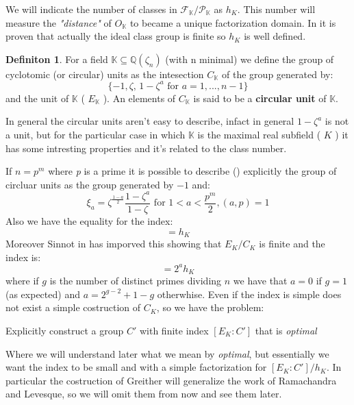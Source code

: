 \documentclass[]{article}
\theoremstyle{plain}
\theoremstyle{remark}
\theoremstyle{definition}
\newtheorem{deff}[teo]{Definiton}
\newcommand{\K}{\mathbb{K}}
\newcommand{\Q}{\mathbb{Q}}
\begin{document}
	We will indicate the number of classes in $ \mathcal{F}_\K / \mathcal{P}_\K $ as $ h_K $. This number will measure the \textit{"distance"} of $ O_\K $ to became a unique factorization domain. In \cite[Page~141]{RIN} it is proven that actually the ideal class group is finite so $ h_K $ is well defined. 

	
	\begin{deff}
		For a field $ \K \subseteq \Q (\zeta_n) $ (with n minimal) we define the group of cyclotomic (or circular) units as the intesection $ C_\K $ of the group generated by:
		\begin{equation*}
			\{ -1 ,  \zeta , \, 1 - \zeta ^a \text{ for } a = 1, ... , n-1 \}
		\end{equation*}
		and the unit of $ \K $ ( $ E_{\K} $ ). An elements of $ C_\K $ is said to be a \textbf{circular unit} of $ \K $. 
	\end{deff}

	In general the circular units aren't easy to describe, infact in general $ 1 - \zeta ^a $ is not a unit, but for the particular case in which $ \K $ is the maximal real subfield ( $ K $ ) it has some intresting properties and it's related to the class number.
	
	
	If $ n=p^m $ where \textit{p} is a prime it is possible to describe (\cite[Lemma~8.1, Theorem~8.2]{CF}) explicitly the group of circluar units as the group generated by $ -1 $ and:
	\[
		\xi_a = \zeta^{ \frac{1-a}{2}} \frac{1 - \zeta ^a}{1 - \zeta } \text{ for } 1 < a < \frac{p^m}{2}, (a,p)=1
	\]
	Also we have the equality for the index:
	\begin{equation*}
		[ E_K : C_K ] = h_K
	\end{equation*}
	Moreover Sinnot in \cite{SIN} has imporved this showing that $ E_K / C_K $ is finite and the index is:
	 \begin{equation*}
		 [ E_K : C_K ] = 2^a h_K
	 \end{equation*}
	 where if $ g $ is the number of distinct primes dividing $ n $ we have that $ a=0 $ if $ g=1 $ (as expected) and $ a = 2^{g-2} + 1 - g $ otherwhise. 
	 Even if the index is simple does not exist a simple costruction of $ C_K $, so we have the problem:
	 
	 \begin{tcolorbox}
	 	Explicitly construct a group $ C' $ with finite index $ [ E_K : C' ] $ that is \textit{optimal}
	 \end{tcolorbox}
 
 	Where we will understand later what we mean by \textit{optimal}, but essentially we want the index to be small and with a simple factorization for $ [ E_K : C' ] / h_K $. In particular the costruction of Greither will generalize the work of Ramachandra and Levesque, so we will omit them from now and see them later. 
	 
\end{document}
